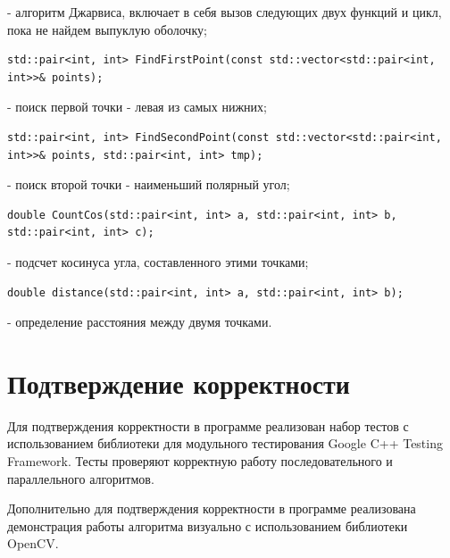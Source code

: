 \documentclass{report}
\begin{document}
- алгоритм Джарвиса, включает в себя вызов следующих двух функций и цикл, пока не найдем выпуклую оболочку;

\vspace{10pt}
\begin{lstlisting}
std::pair<int, int> FindFirstPoint(const std::vector<std::pair<int, int>>& points);
\end{lstlisting}
\vspace{-25pt}

- поиск первой точки - левая из самых нижних;

\vspace{10pt}
\begin{lstlisting}
std::pair<int, int> FindSecondPoint(const std::vector<std::pair<int, int>>& points, std::pair<int, int> tmp);
\end{lstlisting}
\vspace{-25pt}

- поиск второй точки - наименьший полярный угол;

\vspace{10pt}
\begin{lstlisting}
double CountCos(std::pair<int, int> a, std::pair<int, int> b, std::pair<int, int> c);
\end{lstlisting}
\vspace{-25pt}

- подсчет косинуса угла, составленного этими точками;

\vspace{10pt}
\begin{lstlisting}
double distance(std::pair<int, int> a, std::pair<int, int> b);
\end{lstlisting}
\vspace{-25pt}

- определение расстояния между двумя точками.

\newpage

\section{Подтверждение корректности}
Для подтверждения корректности в программе реализован набор тестов с использованием библиотеки для модульного тестирования Google C++ Testing Framework. Тесты проверяют корректную работу последовательного и параллельного алгоритмов.
\par Дополнительно для подтверждения корректности в программе реализована демонстрация работы алгоритма визуально с использованием библиотеки OpenCV.
\end{document}
